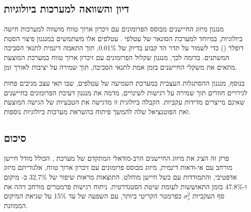\subsection{דיון והשוואה למערכות ביולוגיות}
\label{sec:ch05_bio_comparison}

מנגנון מיזוג החיישנים מבוסס הפרומונים עם זיכרון ארוך טווח מושווה למערכות חישה ביולוגיות, במיוחד למערכת הסונאר של עטלפי . עטלפים אלו משתמשים במנגנון פיצוי הסטת דופלר () כדי לשמור על תדר הד קבוע בדיוק של 0.01\%, תוך התאמה דינמית לתנאי הסביבה המשתנים. בדומה לכך, מנגנון שקלול הפרומונים עם זיכרון ארוך טווח במערכת המוצעת מתאים את משקלי החיישנים בזמן אמת לתנאי הסביבה, תוך שמירה על יציבות לאורך זמן.

בנוסף, מנגנון ההסתגלות העצבית במערכת השמיעה של עטלפים, שבו תאי עצב מגיבים פחות לגירויים חוזרים תוך שמירה על רגישות לשינויים, מדמה את מנגנון דעיכת הפרומונים בחיישנים שאינם מייצרים מדידות עקביות. הקבלה ביולוגית זו מדגישה את הטבעיות של הגישה המוצעת ואת הפוטנציאל שלה להמשך פיתוח בהשראת מערכות ביולוגיות נוספות.

\subsection{סיכום}
\label{sec:ch05_summary}

פרק זה הציג את מיזוג החיישנים הרב-מודאלי המתקדם של מערכת , הכולל מודל חיישן מורחב עם אי-ודאות דינמית, מיזוג מבוסס פרומונים עם זיכרון ארוך טווח, אלגוריתם מיזוג אדפטיבי, והתמודדות עם כשל חיישן מוחלט. התוצאות מראות שיפור של 32.7\% ב- מיקום ו-47.8\% בזמן התאוששות לעומת שיטת  הסטנדרטית. ניתוח רגישות פרמטרים מורחב זיהה את סף העקביות $\sigma_{s}^{2}$ כפרמטר הקריטי ביותר, עם השפעה של עד 15\% על שגיאת המיקום הממוזגת.

\cite{Lynen2013Fusion, Qin2018VINSMono, Kalman1960, Thrun2005Probabilistic}
